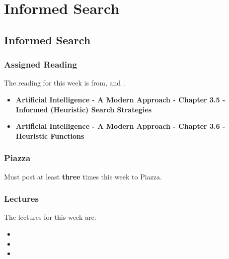 \clearpage

\renewcommand{\ChapTitle}{Informed Search}
\renewcommand{\SectionTitle}{Informed Search}

\chapter{\ChapTitle}

\section{\SectionTitle}

\subsection{Assigned Reading}

The reading for this week is from, \AITextbook \hspace*{1pt} and \RLTextbook.

\begin{itemize}
    \item \textbf{Artificial Intelligence - A Modern Approach - Chapter 3.5 - Informed (Heuristic) Search Strategies}
    \item \textbf{Artificial Intelligence - A Modern Approach - Chapter 3.6 - Heuristic Functions}
\end{itemize}

\subsection{Piazza}

Must post at least \textbf{three} times this week to Piazza.

\subsection{Lectures}

The lectures for this week are:

\begin{itemize}
    \item {}
    \item {}
    \item {}
\end{itemize}

